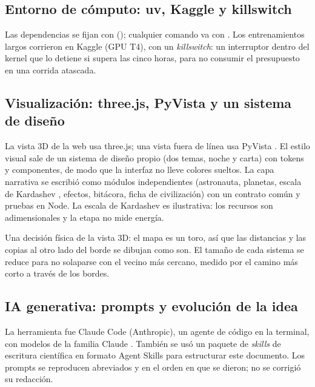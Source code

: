 \documentclass[11pt,a4paper]{article}
\newcommand{\codigo}[1]{\texttt{\detokenize{#1}}}
\begin{document}
\subsection{Entorno de c\'omputo: uv, Kaggle y killswitch}

Las dependencias se fijan con \codigo{uv} (\codigo{uv.lock}); cualquier comando va con \codigo{uv run}. Los entrenamientos largos corrieron en Kaggle (GPU T4), con un \emph{killswitch}: un interruptor dentro del kernel que lo detiene si supera las cinco horas, para no consumir el presupuesto en una corrida atascada.

\subsection{Visualizaci\'on: three.js, PyVista y un sistema de dise\~no}

La vista 3D de la web usa three.js; una vista fuera de l\'inea usa PyVista \cite{sullivan2019}. El estilo visual sale de un sistema de dise\~no propio (dos temas, noche y carta) con tokens y componentes, de modo que la interfaz no lleve colores sueltos. La capa narrativa se escribi\'o como m\'odulos independientes (astronauta, planetas, escala de Kardashev \cite{kardashev1964}, efectos, bit\'acora, ficha de civilizaci\'on) con un contrato com\'un y pruebas en Node. La escala de Kardashev es ilustrativa: los recursos son adimensionales y la etapa no mide energ\'ia.

Una decisi\'on f\'isica de la vista 3D: el mapa es un toro, as\'i que las distancias y las copias al otro lado del borde se dibujan como son. El tama\~no de cada sistema se reduce para no solaparse con el vecino m\'as cercano, medido por el camino m\'as corto a trav\'es de los bordes.

\subsection{IA generativa: prompts y evoluci\'on de la idea}
\label{sec:prompts}

La herramienta fue Claude Code (Anthropic), un agente de c\'odigo en la terminal, con modelos de la familia Claude \cite{anthropicclaudecode}. Tambi\'en se us\'o un paquete de \emph{skills} de escritura cient\'ifica en formato Agent Skills \cite{agentskills} para estructurar este documento. Los prompts se reproducen abreviados y en el orden en que se dieron; no se corrigi\'o su redacci\'on.
\end{document}
